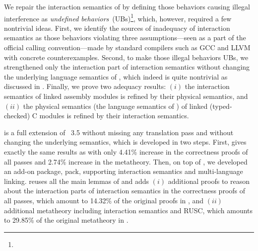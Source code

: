 We repair the interaction semantics of \ccc{} by defining those behaviors causing
illegal interference as \emph{undefined behaviors}~(UBs)\footnote{}, which,
however, required a few nontrivial ideas. First, we identify the
sources of inadequacy of interaction semantics as those behaviors
violating three assumptions---seen as a part of the official calling convention---made
by standard compilers such as GCC and LLVM with concrete counterexamples.
Second, to make those illegal
behaviors UBs, we strengthened only the interaction part of
interaction semantics without changing the underlying language
semantics of \cc{}, which indeed is quite nontrivial as
discussed in . Finally, we
prove two adequacy results: $(i)$ the interaction semantics of linked
assembly modules is refined by their physical semantics, and $(ii)$
the physical semantics (\ie the language semantics of \cc{}) of linked
(typed-checked) C modules is refined by their interaction semantics.

\ccm{} is a full extension of \cc{}~3.5 without missing any
translation pass and without changing the underlying semantics,
which is developed in two steps. First, 
\ccr{} gives exactly the same results as \cc{} with only 4.41\%
increase in the correctness proofs of all passes and 2.74\% increase in
the metatheory. Then, on top of \ccr{}, we developed an add-on
package, \ccm{} pack, supporting interaction semantics and multi-language
linking. \ccm{} reuses all the main lemmas of \ccr{} and adds $(i)$
additional proofs to reason about the interaction parts of
interaction semantics in the correctness proofs of all passes, which amount to
14.32\% of the original proofs in \cc{}, and $(ii)$ additional
metatheory including interaction semantics and RUSC, which
amounts to 29.85\% of the original metatheory in \cc{}.

